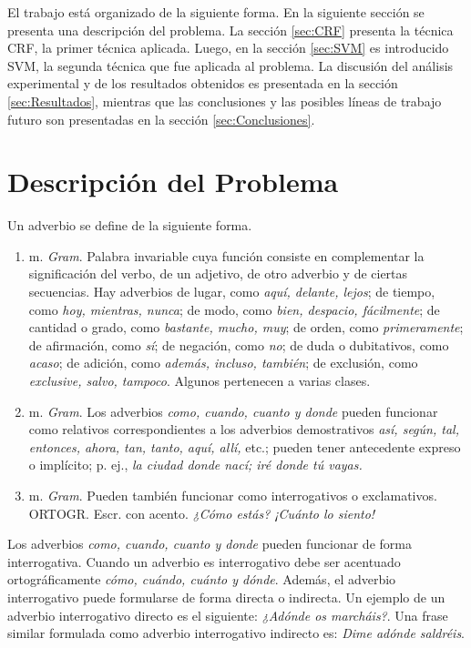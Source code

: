\documentclass[runningheads,a4paper]{llncs}
\begin{document}
El trabajo está organizado de la siguiente forma. En la siguiente sección se presenta una descripción del problema. La sección \ref{sec:CRF} presenta la técnica CRF, la primer técnica aplicada. Luego, en la sección \ref{sec:SVM} es introducido SVM, la segunda técnica que fue aplicada al problema. La discusión del análisis experimental y de los resultados obtenidos es presentada en la sección \ref{sec:Resultados}, mientras que las conclusiones y las posibles líneas de trabajo futuro son presentadas en la sección \ref{sec:Conclusiones}.

\section{Descripción del Problema}
Un adverbio se define de la siguiente forma\cite{RAE}.

\begin{enumerate}
\item{m. \emph{Gram}. Palabra invariable cuya función consiste en complementar la significación del verbo, de un adjetivo, de otro adverbio y de ciertas secuencias. Hay adverbios de lugar, como \emph{aquí, delante, lejos}; de tiempo, como \emph{hoy, mientras, nunca}; de modo, como \emph{bien, despacio, fácilmente}; de cantidad o grado, como \emph{bastante, mucho, muy}; de orden, como \emph{primeramente}; de afirmación, como \emph{sí}; de negación, como \emph{no}; de duda o dubitativos, como \emph{acaso}; de adición, como \emph{además, incluso, también}; de exclusión, como \emph{exclusive, salvo, tampoco}. Algunos pertenecen a varias clases.}
\item{m. \emph{Gram}. Los adverbios \emph{como, cuando, cuanto y donde} pueden funcionar como relativos correspondientes a los adverbios demostrativos \emph{así, según, tal, entonces, ahora, tan, tanto, aquí, allí,} etc.; pueden tener antecedente expreso o implícito; p. ej., \emph{la ciudad donde nací; iré donde tú vayas.}}
\item{m. \emph{Gram}. Pueden también funcionar como interrogativos o exclamativos. ORTOGR. Escr. con acento. \emph{¿Cómo estás? ¡Cuánto lo siento!}}
\end{enumerate}

Los adverbios \emph{como, cuando, cuanto y donde} pueden funcionar de forma interrogativa. Cuando un adverbio es interrogativo debe ser acentuado ortográficamente \emph{cómo, cuándo, cuánto y dónde}. Además, el adverbio interrogativo puede formularse de forma directa o indirecta\cite{VECIANA04}. Un ejemplo de un adverbio interrogativo directo es el siguiente: \emph{¿Adónde os marcháis?}. Una frase similar formulada como adverbio interrogativo indirecto es: \emph{Dime adónde saldréis}.
\end{document}

